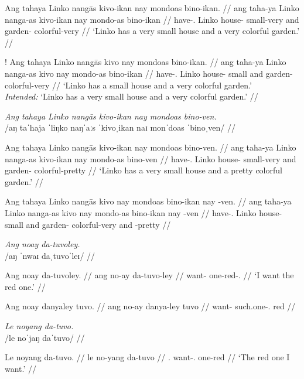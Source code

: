 \documentclass[12pt,a4paper]{scrartcl}
\newcommand{\PargI}{{\Parg}.{\Inan}}
\newcommand{\PatTI}{{\PatT}.{\Inan}}
\newcommand{\TsgM}{{\Tsg}.{\M}}
\begin{document}
\gla Ang tahaya Linko nangās kivo-ikan nay mondoas bino-ikan. //
\glb ang taha-ya Linko nanga-as kivo-ikan nay mondo-as bino-ikan //
\glc \AgtT{} have-\TsgM{} Linko house-\Parg{} small-very and garden-\Parg{} colorful-very //
\glft `Linko has a very small house and a very colorful garden.' //
\endgl

\a\ljudge!\begingl
\gla Ang tahaya Linko nangās kivo nay mondoas bino-ikan. //
\glb ang taha-ya Linko nanga-as kivo nay mondo-as bino-ikan //
\glc \AgtT{} have-\TsgM{} Linko house-\Parg{} small and garden-\Parg{} colorful-very //
\glft `Linko has a small house and a very colorful garden.' \\
	\textit{Intended:} `Linko has a very small house and a very colorful garden.' //
\endgl

\xe

\pex
\a\begingl
\glpreamble \textit{Ang tahaya Linko nangās kivo-ikan nay mondoas bino-ven.} \\
	/aŋ taˈhaja ˈliŋko naŋˈaːs ˈkivoˌikan naɪ monˈdoas ˈbinoˌven/ //

\gla Ang tahaya Linko nangās kivo-ikan nay mondoas bino-ven. //
\glb ang taha-ya Linko nanga-as kivo-ikan nay mondo-as bino-ven //
\glc \AgtT{} have-\TsgM{} Linko house-\Parg{} small-very and garden-\Parg{} colorful-pretty //
\glft `Linko has a very small house and a pretty colorful garden.' //
\endgl

\a\ljudge*\begingl
\gla Ang tahaya Linko nangās kivo nay mondoas bino-ikan nay -ven. //
\glb ang taha-ya Linko nanga-as kivo nay mondo-as bino-ikan nay -ven //
\glc \AgtT{} have-\TsgM{} Linko house-\Parg{} small and garden-\Parg{} colorful-very and -pretty //
\endgl

\xe

\pex
\a\begingl
\glpreamble \textit{Ang noay da-tuvoley.} \\
	/aŋ ˈnwaɪ daˌtuvoˈleɪ/ //

\gla Ang noay da-tuvoley. //
\glb ang no-ay da-tuvo-ley //
\glc \AgtT{} want-\Fsg{} one-red-\PargI{} //
\glft `I want the red one.' //
\endgl

\a\begingl
\gla Ang noay danyaley tuvo. //
\glb ang no-ay danya-ley tuvo //
\glc \AgtT{} want-\Fsg{} such.one-\PargI{} red //
\endgl

\xe

\pex
\a\begingl
\glpreamble \textit{Le noyang da-tuvo.} \\
	/le noˈjaŋ daˈtuvo/ //

\gla Le noyang da-tuvo. //
\glb le no-yang da-tuvo //
\glc \PatTI{} want-\Fsg{}.\Aarg{} one-red //
\glft `The red one I want.' //
\endgl
\end{document}
